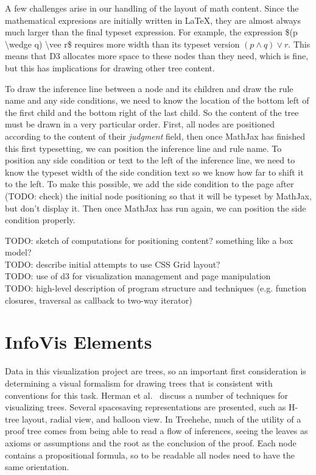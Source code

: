 \documentclass[conference]{IEEEtran}
\newcommand{\projectname}{Treehehe}
\begin{document}
A few challenges arise in our handling of the layout of math content. Since the mathematical expresions are initially written in \LaTeX{}, they are almost always much larger than the final typeset expression. For example, the expression \$(p \textbackslash wedge q) \textbackslash vee r\$ requires more width than its typeset version $(p \wedge q) \vee r$. This means that D3 allocates more space to these nodes than they need, which is fine, but this has implications for drawing other tree content.

To draw the inference line between a node and its children and draw the rule name and any side conditions, we need to know the location of the bottom left of the first child and the bottom right of the last child. So the content of the tree must be drawn in a very particular order. First, all nodes are positioned according to the content of their \textit{judgment} field, then once MathJax has finished this first typesetting, we can position the inference line and rule name. To position any side condition or text to the left of the inference line, we need to know the typeset width of the side condition text so we know how far to shift it to the left. To make this possible, we add the side condition to the page after (TODO: check) the initial node positioning so that it will be typeset by MathJax, but don't display it. Then once MathJax has run again, we can position the side condition properly.

TODO: sketch of computations for positioning content? something like a box model? \\

TODO: describe initial attempts to use CSS Grid layout? \\

TODO: use of d3 for visualization management and page manipulation \\

TODO: high-level description of program structure and techniques (e.g. function closures, traversal as callback to two-way iterator) \\


\section{InfoVis Elements}
\label{sec:infoviselem}

Data in this visualization project are trees, so an important first consideration is determining a visual formalism for drawing trees that is consistent with conventions for this task. Herman et al.~\cite{graphvis-herman+melancon+marshall} discuss a number of techniques for visualizing trees. Several spacesaving representations are presented, such as H-tree layout, radial view, and balloon view. In \projectname{}, much of the utility of a proof tree comes from being able to read a flow of inferences, seeing the leaves as axioms or assumptions and the root as the conclusion of the proof. Each node contains a propositional formula, so to be readable all nodes need to have the same orientation.
\end{document}
